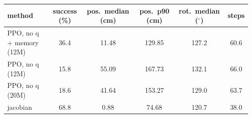\begin{tabular}{lccccc}
\hline
method & success (\%) & pos.\ median (cm) & pos.\ p90 (cm) & rot.\ median ($^\circ$) & steps \\
\hline
PPO, no q + memory (12M) & 36.4 & 11.48 & 129.85 & 127.2 & 60.6 \\
PPO, no q (12M) & 15.8 & 55.09 & 167.73 & 132.1 & 66.0 \\
PPO, no q (20M) & 18.6 & 41.64 & 153.27 & 129.0 & 63.7 \\
jacobian & 68.8 & 0.88 & 74.68 & 120.7 & 38.0 \\
\hline
\end{tabular}
